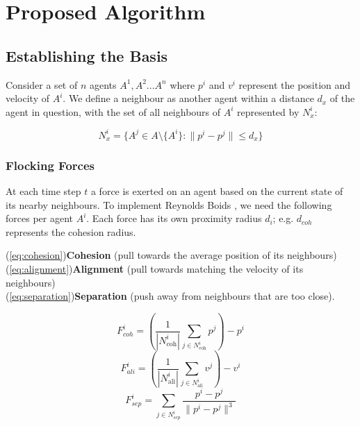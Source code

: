 \documentclass[runningheads]{llncs}
\begin{document}

\section{Proposed Algorithm}
\subsection{Establishing the Basis}
Consider a set of $n$ agents $A^1, A^2...A^n$ where $p^i$ and $v^i$ represent the position and velocity of $A^i$.
We define a neighbour as another agent within a distance $d_x$ of the agent in question, with the set of all neighbours of $A^i$ represented by $N^i_x$:

\begin{equation}
    N^i_x = \{A^j \in A \setminus \{A^i\} : \|p^i - p^j\| \leq d_x\}
\end{equation}

\subsubsection{Flocking Forces}
At each time step $t$ a force is exerted on an agent based on the current state of its nearby neighbours. 
To implement Reynolds Boids \cite{reynolds1987}, we need the following forces per agent $A^i$. 
Each force has its own proximity radius $d_i$; e.g. $d_{coh}$ represents the cohesion radius.

\indent(\ref{eq:cohesion})\nobreakspace\textbf{Cohesion} 
    (pull towards the average position of its neighbours) \\
\indent(\ref{eq:alignment})\nobreakspace\textbf{Alignment} 
    (pull towards matching the velocity of its neighbours)\\
\indent(\ref{eq:separation})\nobreakspace\textbf{Separation} 
    (push away from neighbours that are too close).

\begin{equation}
    F^i_{coh} = (\frac{1}{|N^i_{\text{coh}}|} \sum_{j \in N^i_{\text{coh}}} p^j) - p^i \label{eq:cohesion}
\end{equation}
\begin{equation}
    F^i_{ali} = (\frac{1}{|N^i_{\text{ali}}|} \sum_{j \in N^i_{\text{ali}}} v^j) - v^i \label{eq:alignment}
\end{equation}
\begin{equation}
    F^i_{sep} = \sum_{j \in N^i_{sep}} \frac{p^i - p^j}{\|p^i - p^j\|^3} \label{eq:separation}
\end{equation}
\end{document}
